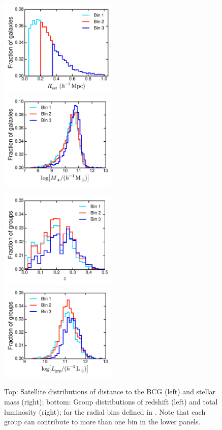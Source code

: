 \begin{figure}
 \centerline{\includegraphics[width=2.2in]{chapter5/hist-AngSepBCG.pdf}
             \includegraphics[width=2.2in]{chapter5/hist-logmstar.pdf}}
 \centerline{\includegraphics[width=2.2in]{chapter5/hist-groups_Zfof.pdf}
             \includegraphics[width=2.2in]{chapter5/hist-groups_logLumB.pdf}}
\caption{Top: Satellite distributions of distance to the BCG (left) and stellar 
mass (right); bottom: Group distributions of redshift (left) and total 
luminosity (right); for the radial bins defined in . Note that each group 
can contribute to more than one bin in the lower panels.}
\label{f:histograms}
\end{figure}

